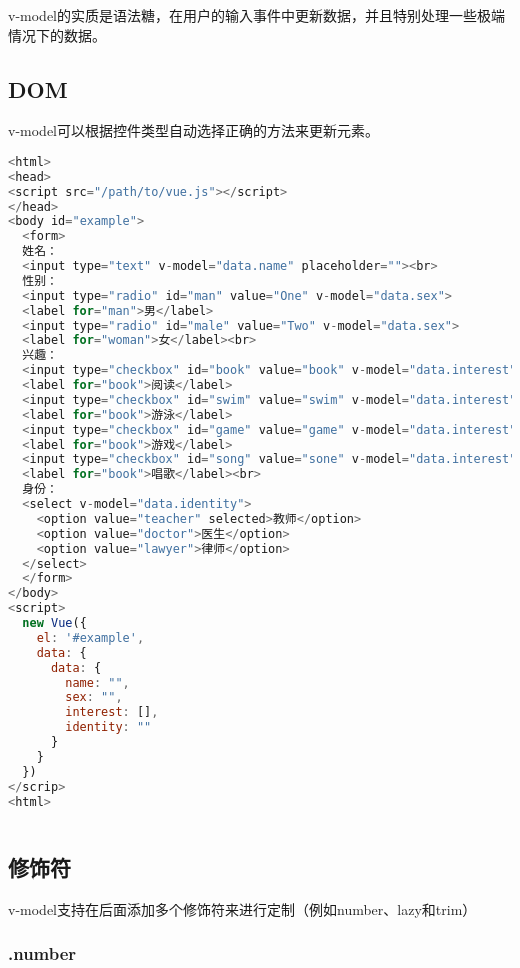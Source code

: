 v-model的实质是语法糖，在用户的输入事件中更新数据，并且特别处理一些极端情况下的数据。


\subsection{DOM}


v-model可以根据控件类型自动选择正确的方法来更新元素。


\begin{lstlisting}[language=JavaScript]
<html>
<head>
<script src="/path/to/vue.js"></script>
</head>
<body id="example">
  <form>
  姓名：
  <input type="text" v-model="data.name" placeholder=""><br>
  性别：
  <input type="radio" id="man" value="One" v-model="data.sex">
  <label for="man">男</label>
  <input type="radio" id="male" value="Two" v-model="data.sex">
  <label for="woman">女</label><br>
  兴趣：
  <input type="checkbox" id="book" value="book" v-model="data.interest">
  <label for="book">阅读</label>
  <input type="checkbox" id="swim" value="swim" v-model="data.interest">
  <label for="book">游泳</label>
  <input type="checkbox" id="game" value="game" v-model="data.interest">
  <label for="book">游戏</label>
  <input type="checkbox" id="song" value="sone" v-model="data.interest">
  <label for="book">唱歌</label><br>
  身份：
  <select v-model="data.identity">
    <option value="teacher" selected>教师</option>
    <option value="doctor">医生</option>
    <option value="lawyer">律师</option>
  </select>
  </form>
</body>
<script>
  new Vue({
    el: '#example',
    data: {
      data: {
        name: "",
        sex: "",
        interest: [],
        identity: ""
      }
    }
  })
</scrip>
<html>
\end{lstlisting}



\begin{lstlisting}[language=JavaScript]

\end{lstlisting}


\subsection{修饰符}

v-model支持在后面添加多个修饰符来进行定制（例如number、lazy和trim）


\subsubsection{.number}

